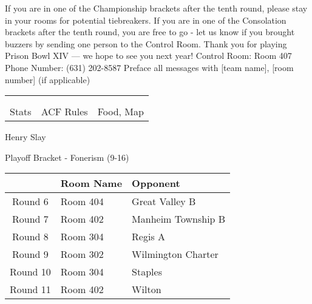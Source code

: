 \documentclass{article}%
\begin{document}
\vspace*{30pt}%
\linebreak%
If you are in one of the Championship brackets after the tenth round, please stay in your rooms for potential tiebreakers.\newline%
\newline%
If you are in one of the Consolation brackets after the tenth round, you are free to go {-} let us know if you brought buzzers by sending one person to the Control Room.\newline%
\newline%
Thank you for playing Prison Bowl XIV — we hope to see you next year!\newline%
\newline%
Control Room: Room 407\newline%
Phone Number: (631) 202{-}8587\newline%
Preface all messages with {[}team name{]}, {[}room number{]} (if applicable)%
\vspace*{30pt}%
\newline%
%
\begin{tabularx}{\textwidth}{YYY}%
  &  &  \\%
\\%
Stats&ACF Rules&Food, Map\\%
\end{tabularx}%
\newpage%
\begin{center}%
\begin{Huge}%
Henry Slay%
\end{Huge}%
\vspace*{12pt}%
\linebreak%
\begin{Large}%
Playoff Bracket {-} Fonerism (9{-}16)%
\end{Large}%
\end{center}%
\vspace*{4pt}%
%
\begin{tabularx}{\textwidth}{|c|Y|Y|}%
\hline%
&Room Name&Opponent\\%
\hline%
Round 6&Room 404&Great Valley B\\%
Round 7&Room 402&Manheim Township B\\%
Round 8&Room 304&Regis A\\%
Round 9&Room 302&Wilmington Charter\\%
Round 10&Room 304&Staples\\%
Round 11&Room 402&Wilton\\%
\hline%
\end{tabularx}%
\end{document}
